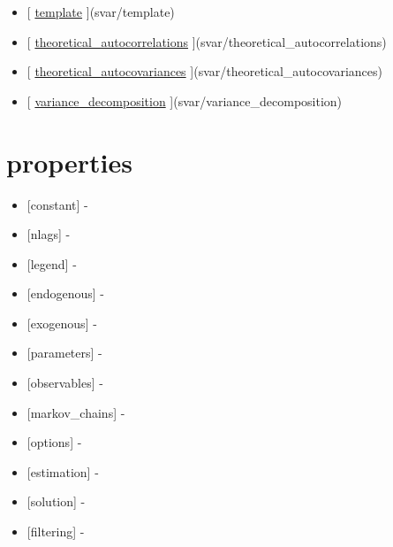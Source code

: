 \documentclass[letterpaper,10pt,english]{sphinxmanual}
\begin{document}
\begin{itemize}
\item {} 
{[} {\hyperref[classes/models/@svar/svar:template]{template}} {]}(svar/template)

\item {} 
{[} {\hyperref[classes/models/@svar/svar:theoretical-autocorrelations]{theoretical\_autocorrelations}} {]}(svar/theoretical\_autocorrelations)

\item {} 
{[} {\hyperref[classes/models/@svar/svar:theoretical-autocovariances]{theoretical\_autocovariances}} {]}(svar/theoretical\_autocovariances)

\item {} 
{[} {\hyperref[classes/models/@svar/svar:variance-decomposition]{variance\_decomposition}} {]}(svar/variance\_decomposition)

\end{itemize}


\section{properties}
\label{classes/models/@svar/svar:properties}\begin{itemize}
\item {} 
{[}constant{]} -

\item {} 
{[}nlags{]} -

\item {} 
{[}legend{]} -

\item {} 
{[}endogenous{]} -

\item {} 
{[}exogenous{]} -

\item {} 
{[}parameters{]} -

\item {} 
{[}observables{]} -

\item {} 
{[}markov\_chains{]} -

\item {} 
{[}options{]} -

\item {} 
{[}estimation{]} -

\item {} 
{[}solution{]} -

\item {} 
{[}filtering{]} -

\end{itemize}
\end{document}
